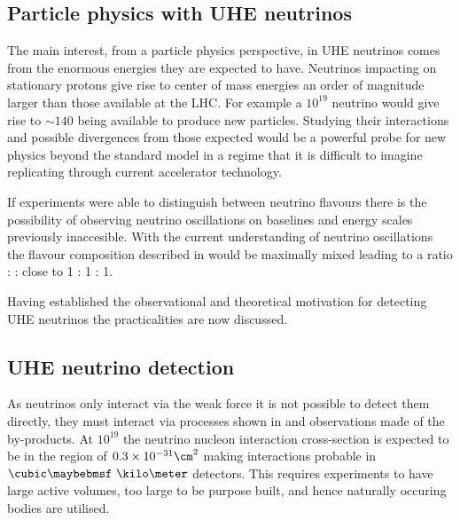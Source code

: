 \subsection{Particle physics with UHE neutrinos}
\label{sec:uhe-app:UHEN:particle-physics}

The main interest, from a particle physics perspective, in UHE neutrinos comes from the enormous energies they are expected to have. Neutrinos impacting on stationary protons give rise to center of mass energies an order of magnitude larger than those available at the LHC. For example a $10^{19}$ \eV neutrino would give rise to $\sim 140$ \TeV being available to produce new particles. Studying their interactions and possible divergences from those expected would be a powerful probe for new physics beyond the standard model in a regime that it is difficult to imagine replicating through current accelerator technology.

If experiments were able to distinguish between neutrino flavours there is the possibility of observing neutrino oscillations on baselines and energy scales previously inaccesible. With the current understanding of neutrino oscillations the flavour composition described in  would be maximally mixed leading to a ratio \Pnue : \Pnum : \Pnut close to 1 : 1 : 1.

Having established the observational and theoretical motivation for detecting UHE neutrinos the practicalities are now discussed.

\subsection{UHE neutrino detection}
\label{sec:uhe-app:UHEN:detection}

As neutrinos only interact via the weak force it is not possible to detect them directly, they must interact via processes shown in  and observations made of the by-products. At $10^{19}$ \eV the neutrino nucleon interaction cross-section is expected to be in the region of $0.3 \times 10^{-31} \cm^{2}$ making interactions probable in $\cubic\km$ detectors. This requires experiments to have large active volumes, too large to be purpose built, and hence naturally occuring bodies are utilised.

